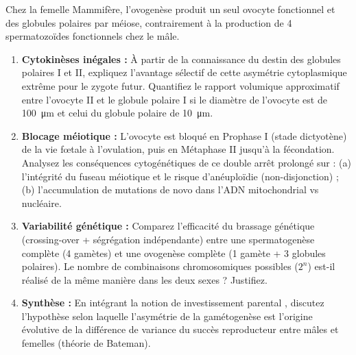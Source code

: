 \documentclass[11pt]{article}
\begin{document}
\begin{exercice}
Chez la femelle Mammifère, l'ovogenèse produit un seul ovocyte fonctionnel et des globules polaires par méiose, contrairement à la production de 4 spermatozoïdes fonctionnels chez le mâle.
\begin{enumerate}
    \item \textbf{Cytokinèses inégales :} À partir de la connaissance du destin des globules polaires I et II, expliquez l'avantage sélectif de cette asymétrie cytoplasmique extrême pour le zygote futur. Quantifiez le rapport volumique approximatif entre l'ovocyte II et le globule polaire I si le diamètre de l'ovocyte est de \SI{100}{\micro\meter} et celui du globule polaire de \SI{10}{\micro\meter}.
    \item \textbf{Blocage méiotique :} L'ovocyte est bloqué en Prophase I (stade dictyotène) de la vie fœtale à l'ovulation, puis en Métaphase II jusqu'à la fécondation. Analysez les conséquences cytogénétiques de ce double arrêt prolongé sur : (a) l'intégrité du fuseau méiotique et le risque d'anéuploïdie (non-disjonction) ; (b) l'accumulation de mutations de novo dans l'ADN mitochondrial vs nucléaire.
    \item \textbf{Variabilité génétique :} Comparez l'efficacité du brassage génétique (crossing-over + ségrégation indépendante) entre une spermatogenèse complète (4 gamètes) et une ovogenèse complète (1 gamète + 3 globules polaires). Le nombre de combinaisons chromosomiques possibles ($2^n$) est-il réalisé de la même manière dans les deux sexes ? Justifiez.
    \item \textbf{Synthèse :} En intégrant la notion de \og investissement parental \fg{}, discutez l'hypothèse selon laquelle l'asymétrie de la gamétogenèse est l'origine évolutive de la différence de variance du succès reproducteur entre mâles et femelles (théorie de Bateman).
\end{enumerate}
\end{exercice}
\end{document}
